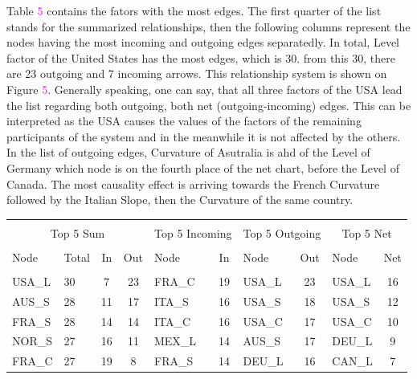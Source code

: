 \documentclass[12pt,bibliography=totoc]{article}
\begin{document}
{Table \textcolor{magenta}{5} contains the fators with the most edges. The first quarter of the list stands for the summarized relationships, then the following columns represent the nodes having the most incoming and outgoing edges separatedly. In total, Level factor of the United States has the most edges, which is 30. from this 30, there are 23 outgoing and 7 incoming arrows. This relationship system is shown on Figure \textcolor{magenta}{5}. Generally speaking, one can say, that all three factors of the USA lead the list regarding both outgoing, both net (outgoing-incoming) edges. This can be interpreted as the USA causes the values of the factors of the remaining participants of the system and in the meanwhile it is not affected by the others. In the list of outgoing edges, Curvature of Asutralia is ahd of the Level of Germany which node is on the fourth place of the net chart, before the Level of Canada. The most causality effect is arriving towards the French Curvature followed by the Italian Slope, then the Curvature of the same country.

\begin{table}[h]

\fontsize{10}{10}\selectfont
\setlength{\tabcolsep}{10pt}
\centering%
\begin{tabular}{l  lcc  lc lc  lc}%

\hline\hline \\ [-1.5ex]                         %


\multicolumn{4}{c}{Top 5 Sum}					&	\multicolumn{2}{c}{Top 5 Incoming}			&	\multicolumn{2}{c}{Top 5 Outgoing}			&	\multicolumn{2}{c}{Top 5 Net}	\\	
\hline \\ [-1.5ex]    
Node	&	Total 	&	In	&	Out	&	Node	&	In	&	Node	&	Out	&	Node	&	Net	\\
\hline \\ [-1.5ex]    
USA\_L&	30	&	7	&	23	&	FRA\_C	&	19	&	USA\_L	&	23	&	USA\_L	&	16	\\
AUS\_S	&	28	&	11	&	17	&	ITA\_S	&	16	&	USA\_S	&	18	&	USA\_S	&	12	\\
FRA\_S	&	28	&	14	&	14	&	ITA\_C	&	16	&	USA\_C	&	17	&	USA\_C	&	10	\\
NOR\_S	&	27	&	16	&	11	&	MEX\_L	&	14	&	AUS\_S	&	17	&	DEU\_L	&	9	\\
FRA\_C	&	27	&	19	&	8	&	FRA\_S	&	14	&	DEU\_L	&	16	&	CAN\_L	&	7	\\


\end{tabular}
\end{table}}
\end{document}
